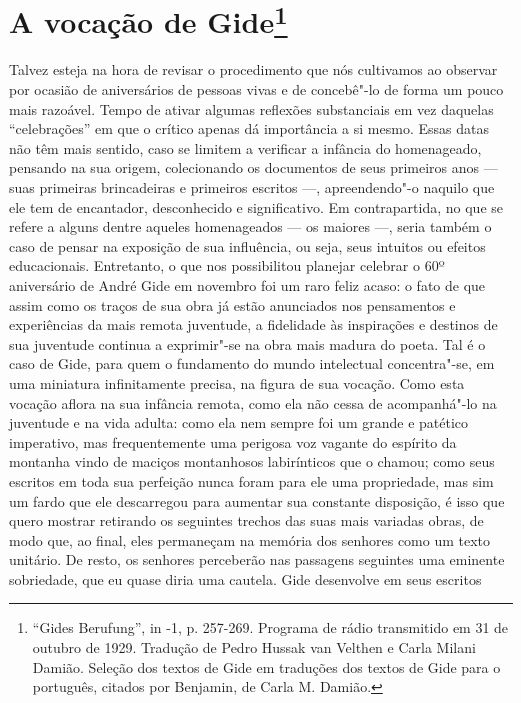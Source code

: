 \chapter{A vocação de Gide\footnote[*]{``Gides Berufung'', in -1, p. 257-269. Programa de rádio transmitido em 31 de outubro de 1929. Tradução de Pedro
  Hussak van Velthen e Carla Milani Damião. Seleção dos textos de Gide
  em traduções dos textos de Gide para o português, citados por
  Benjamin, de Carla M. Damião.}}

Talvez esteja na hora de revisar o procedimento que nós cultivamos ao
observar por ocasião de aniversários de pessoas vivas e de concebê"-lo de
forma um pouco mais razoável. Tempo de ativar algumas reflexões
substanciais em vez daquelas ``celebrações'' em que o crítico apenas
dá importância a si mesmo. Essas datas não têm mais sentido, caso se limitem a verificar a infância do homenageado, pensando na sua origem, colecionando os documentos de seus primeiros anos --- suas primeiras brincadeiras e primeiros escritos ---, apreendendo"-o naquilo que ele tem de encantador, desconhecido e significativo. Em
contrapartida, no que se refere a alguns dentre aqueles homenageados --- os maiores ---,
seria também o caso de pensar na exposição de sua influência, ou seja, seus intuitos ou
efeitos educacionais. Entretanto, o que nos possibilitou planejar celebrar o 60º aniversário de André Gide em novembro foi um raro feliz acaso: o fato de que assim como os traços de sua
obra já estão anunciados nos pensamentos e experiências da mais remota
juventude, a fidelidade às inspirações e destinos de sua
juventude continua a exprimir"-se na obra mais madura do poeta.
Tal é o caso de Gide, para quem o
fundamento do mundo intelectual concentra"-se,
em uma miniatura infinitamente precisa, na figura de sua vocação. Como esta
vocação aflora na sua infância remota, como ela não cessa de
acompanhá"-lo na juventude e na vida adulta: como ela nem sempre foi um grande e
patético imperativo, mas frequentemente uma perigosa voz vagante do
espírito da montanha vindo de maciços montanhosos
labirínticos que o chamou; como seus escritos em toda sua perfeição nunca foram para
ele uma propriedade, mas sim um fardo que ele descarregou para aumentar
sua constante disposição, é isso que quero mostrar retirando os seguintes trechos das
suas mais variadas obras, de modo que, ao final,
eles permaneçam na memória dos senhores como um texto unitário. De
resto, os senhores perceberão nas passagens seguintes uma eminente
sobriedade, que eu quase diria uma cautela. Gide desenvolve em seus escritos
